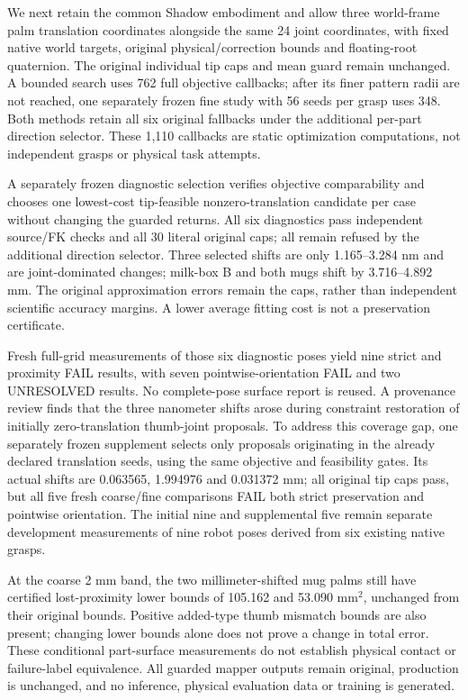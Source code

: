 We next retain the common Shadow embodiment and allow three world-frame palm
translation coordinates alongside the same 24 joint coordinates, with fixed
native world targets, original physical/correction bounds and floating-root
quaternion. The original individual tip caps and mean guard remain unchanged.
A bounded search uses 762 full objective callbacks; after its finer pattern
radii are not reached, one separately frozen fine study with 56 seeds per grasp uses 348.
Both methods retain all six original fallbacks under the additional per-part
direction selector. These 1,110 callbacks are static optimization computations,
not independent grasps or physical task attempts.

A separately frozen diagnostic selection verifies objective comparability and
chooses one lowest-cost tip-feasible nonzero-translation candidate per case
without changing the guarded returns. All six diagnostics pass independent
source/FK checks and all 30 literal original caps; all remain refused by the
additional direction selector. Three selected shifts are only 1.165--3.284 nm and are
joint-dominated changes; milk-box B and both mugs shift by 3.716--4.892 mm.
The original approximation errors remain the caps, rather than independent
scientific accuracy margins. A lower average fitting cost is not a preservation
certificate.

Fresh full-grid measurements of those six diagnostic poses yield nine strict
and proximity FAIL results, with seven pointwise-orientation FAIL and two
UNRESOLVED results. No complete-pose surface report is reused. A provenance
review finds that the three nanometer shifts arose during constraint
restoration of initially zero-translation thumb-joint proposals. To address
this coverage gap, one separately frozen supplement selects only proposals
originating in the already declared translation seeds, using the same
objective and feasibility gates. Its actual shifts are 0.063565, 1.994976 and
0.031372 mm; all original tip caps pass, but all five fresh coarse/fine
comparisons FAIL both strict preservation and pointwise orientation. The
initial nine and supplemental five remain separate development measurements
of nine robot poses derived from six existing native grasps.

At the coarse 2 mm band, the two millimeter-shifted mug palms still have
certified lost-proximity lower bounds of 105.162 and 53.090 mm$^2$, unchanged
from their original bounds. Positive added-type thumb mismatch bounds are also
present; changing lower bounds alone does not prove a change in total error.
These conditional part-surface measurements do not establish physical contact
or failure-label equivalence. All guarded mapper outputs remain original,
production is unchanged, and no inference, physical evaluation data or training
is generated.
